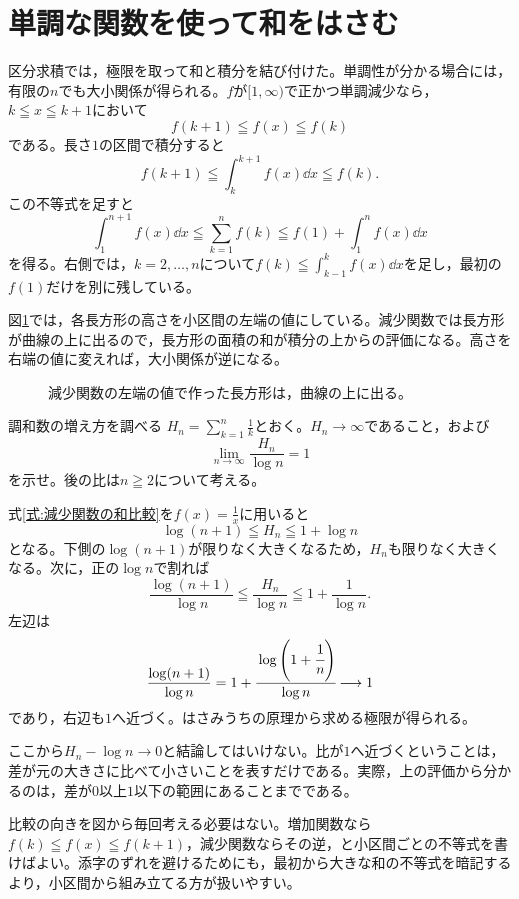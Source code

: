 \section{単調な関数を使って和をはさむ}\label{節:和と積分の比較}

区分求積では，極限を取って和と積分を結び付けた。単調性が分かる場合には，有限の$n$でも大小関係が得られる。$f$が$[1,\infty)$で正かつ単調減少なら，$k\leqq x\leqq k+1$において
\[
 f(k+1)\leqq f(x)\leqq f(k)
\]
である。長さ$1$の区間で積分すると
\[
 f(k+1)\leqq\int_k^{k+1}f(x)\dd x\leqq f(k).
\]
この不等式を足すと
\begin{equation}\label{式:減少関数の和比較}
 \int_1^{n+1}f(x)\dd x
 \leqq\sum_{k=1}^{n}f(k)
 \leqq f(1)+\int_1^{n}f(x)\dd x
\end{equation}
を得る。右側では，$k=2,\ldots,n$について$f(k)\leqq\int_{k-1}^{k}f(x)\dd x$を足し，最初の$f(1)$だけを別に残している。

図\ref{図:和と積分の比較}では，各長方形の高さを小区間の左端の値にしている。減少関数では長方形が曲線の上に出るので，長方形の面積の和が積分の上からの評価になる。高さを右端の値に変えれば，大小関係が逆になる。

\begin{figure}[htbp]
 \centering
 \caption{減少関数の左端の値で作った長方形は，曲線の上に出る。}
 \label{図:和と積分の比較}
\end{figure}

\begin{example}{調和数の増え方を調べる}
$H_n=\sum_{k=1}^{n}\frac1k$とおく。$H_n\to\infty$であること，および
\[
 \lim_{n\to\infty}\frac{H_n}{\log n}=1
\]
を示せ。後の比は$n\geqq2$について考える。
\end{example}

式\eqref{式:減少関数の和比較}を$f(x)=\frac1x$に用いると
\[
 \log(n+1)\leqq H_n\leqq1+\log n
\]
となる。下側の$\log(n+1)$が限りなく大きくなるため，$H_n$も限りなく大きくなる。次に，正の$\log n$で割れば
\[
 \frac{\log(n+1)}{\log n}
 \leqq\frac{H_n}{\log n}
 \leqq1+\frac1{\log n}.
\]
左辺は
\[
 \frac{\log(n+1)}{\log n}
 =1+\cfrac{\log\left(1+\cfrac1n\right)}{\log n}
 \longrightarrow1
\]
であり，右辺も$1$へ近づく。はさみうちの原理から求める極限が得られる。

ここから$H_n-\log n\to0$と結論してはいけない。比が$1$へ近づくということは，差が元の大きさに比べて小さいことを表すだけである。実際，上の評価から分かるのは，差が$0$以上$1$以下の範囲にあることまでである。

比較の向きを図から毎回考える必要はない。増加関数なら$f(k)\leqq f(x)\leqq f(k+1)$，減少関数ならその逆，と小区間ごとの不等式を書けばよい。添字のずれを避けるためにも，最初から大きな和の不等式を暗記するより，小区間から組み立てる方が扱いやすい。

